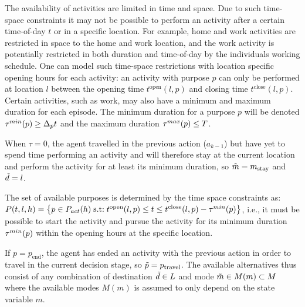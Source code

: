 The availability of activities are limited in time and space. Due to such time-space constraints it may not be possible to perform an activity after a certain time-of-day $t$ or in a specific location. For example, home and work activities are restricted in space to the home and work location, and the work activity is potentially restricted in both duration and time-of-day by the individuals working schedule. One can model such time-space restrictions with location specific opening hours for each activity: an activity with purpose $p$ can only be performed at location $l$ between the opening time $t^{\text{open}}({l,p})$ and closing time $t^{\text{close}}({l,p})$. Certain activities, such as work, may also have a minimum and maximum duration for each episode. The minimum duration for a purpose $p$ will be denoted $\tau^{min}(p)\geq \Delta_p t$ and the maximum duration $\tau^{max}(p)\leq T$. 

When $\tau=0$, the agent travelled in the previous action ($a_{k-1}$) but have yet to spend time performing an activity and will therefore stay at the current location and perform the activity for at least its minimum duration, so $\tilde{m} = m_{\text{stay}}$ and $\tilde{d}=l$. 

The set of available purposes is determined by the time space constraints as:
$P(t,l,h) = \big \{ p \in P_{act}(h) \;\text{s.t:} \; t^{\text{open}}({l,p}) \leq t \leq t^{\text{close}}({l,p}) - \tau^{min}(p) \big \} $, i.e., it must be possible to start the activity and pursue the activity for its minimum duration $\tau^{min}(p)$ within the opening hours at the specific location.



If $p=p_\text{end}$, the agent has ended an activity with the previous action in order to travel in the current decision stage, so $\tilde{p}=p_\text{travel}$. The available alternatives thus consist of any combination of destination $\tilde{d} \in L$ and mode $\tilde{m}\in M(m)\subset M$ where the available modes $M(m)$ is assumed to only depend on the state variable $m$. 


